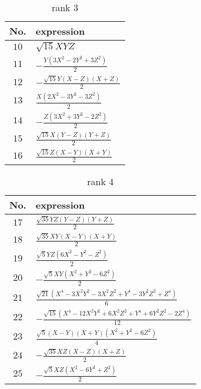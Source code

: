 \documentclass[fleqn,8pt,landscape]{jsarticle}
\begin{document}
\begin{table}[ht!]
\begin{center}
\caption{rank 3}
\renewcommand{\arraystretch}{1.3}
\begin{tabular}{cl} \hline \hline
No. & expression \\ \hline
$ 10 $ & $ \sqrt{15} X Y Z $ \\
$ 11 $ & $ - \frac{Y \left(3 X^{2} - 2 Y^{2} + 3 Z^{2}\right)}{2} $ \\
$ 12 $ & $ - \frac{\sqrt{15} Y \left(X - Z\right) \left(X + Z\right)}{2} $ \\
$ 13 $ & $ \frac{X \left(2 X^{2} - 3 Y^{2} - 3 Z^{2}\right)}{2} $ \\
$ 14 $ & $ - \frac{Z \left(3 X^{2} + 3 Y^{2} - 2 Z^{2}\right)}{2} $ \\
$ 15 $ & $ \frac{\sqrt{15} X \left(Y - Z\right) \left(Y + Z\right)}{2} $ \\
$ 16 $ & $ \frac{\sqrt{15} Z \left(X - Y\right) \left(X + Y\right)}{2} $ \\
 \hline \hline
\end{tabular}
\end{center}
\end{table}
\begin{table}[ht!]
\begin{center}
\caption{rank 4}
\renewcommand{\arraystretch}{1.3}
\begin{tabular}{cl} \hline \hline
No. & expression \\ \hline
$ 17 $ & $ \frac{\sqrt{35} Y Z \left(Y - Z\right) \left(Y + Z\right)}{2} $ \\
$ 18 $ & $ \frac{\sqrt{35} X Y \left(X - Y\right) \left(X + Y\right)}{2} $ \\
$ 19 $ & $ \frac{\sqrt{5} Y Z \left(6 X^{2} - Y^{2} - Z^{2}\right)}{2} $ \\
$ 20 $ & $ - \frac{\sqrt{5} X Y \left(X^{2} + Y^{2} - 6 Z^{2}\right)}{2} $ \\
$ 21 $ & $ \frac{\sqrt{21} \left(X^{4} - 3 X^{2} Y^{2} - 3 X^{2} Z^{2} + Y^{4} - 3 Y^{2} Z^{2} + Z^{4}\right)}{6} $ \\
$ 22 $ & $ - \frac{\sqrt{15} \left(X^{4} - 12 X^{2} Y^{2} + 6 X^{2} Z^{2} + Y^{4} + 6 Y^{2} Z^{2} - 2 Z^{4}\right)}{12} $ \\
$ 23 $ & $ \frac{\sqrt{5} \left(X - Y\right) \left(X + Y\right) \left(X^{2} + Y^{2} - 6 Z^{2}\right)}{4} $ \\
$ 24 $ & $ - \frac{\sqrt{35} X Z \left(X - Z\right) \left(X + Z\right)}{2} $ \\
$ 25 $ & $ - \frac{\sqrt{5} X Z \left(X^{2} - 6 Y^{2} + Z^{2}\right)}{2} $ \\
 \hline \hline
\end{tabular}
\end{center}
\end{table}
\end{document}
